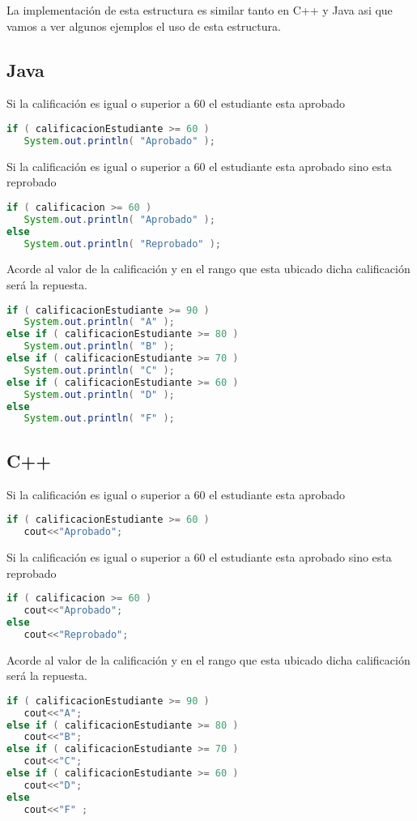 La implementación de esta estructura es similar tanto en C++ y Java asi que vamos a ver algunos ejemplos el uso de esta estructura.

\subsection{Java}
Si la calificación es igual o superior a 60 el estudiante esta aprobado
\begin{lstlisting}[language=Java]
if ( calificacionEstudiante >= 60 )
   System.out.println( "Aprobado" );	
\end{lstlisting}

Si la calificación es igual o superior a 60 el estudiante esta aprobado sino esta reprobado
\begin{lstlisting}[language=Java]
if ( calificacion >= 60 )
   System.out.println( "Aprobado" );
else
   System.out.println( "Reprobado" );
\end{lstlisting}

Acorde al valor de la calificación y en el rango que esta ubicado dicha calificación será la repuesta.
\begin{lstlisting}[language=Java]
if ( calificacionEstudiante >= 90 )
   System.out.println( "A" );
else if ( calificacionEstudiante >= 80 )
   System.out.println( "B" );
else if ( calificacionEstudiante >= 70 )
   System.out.println( "C" );
else if ( calificacionEstudiante >= 60 )
   System.out.println( "D" );
else
   System.out.println( "F" );
\end{lstlisting}



\subsection{C++}
Si la calificación es igual o superior a 60 el estudiante esta aprobado
\begin{lstlisting}[language=Java]
if ( calificacionEstudiante >= 60 )
   cout<<"Aprobado";	
\end{lstlisting}

Si la calificación es igual o superior a 60 el estudiante esta aprobado sino esta reprobado
\begin{lstlisting}[language=Java]
if ( calificacion >= 60 )
   cout<<"Aprobado";
else
   cout<<"Reprobado";
\end{lstlisting}

Acorde al valor de la calificación y en el rango que esta ubicado dicha calificación será la repuesta.
\begin{lstlisting}[language=Java]
if ( calificacionEstudiante >= 90 )
   cout<<"A";
else if ( calificacionEstudiante >= 80 )
   cout<<"B";
else if ( calificacionEstudiante >= 70 )
   cout<<"C";
else if ( calificacionEstudiante >= 60 )
   cout<<"D";
else
   cout<<"F" ;
\end{lstlisting}